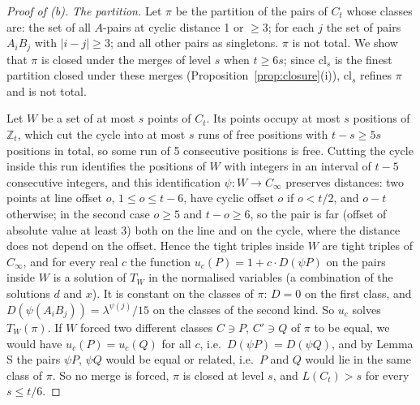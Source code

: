 \documentclass[11pt,a4paper]{article}
\theoremstyle{definition}
\theoremstyle{remark}
\newcommand{\cl}{\mathrm{cl}}
\newcommand{\Z}{\mathbb{Z}}
\newcommand{\step}[1]{\smallskip\noindent\emph{#1}}
\begin{document}
\begin{proof}[Proof of (b)]
\step{The partition.} Let $\pi$ be the partition of the pairs of $C_t$ whose classes are: the set of all $A$-pairs
at cyclic distance 1 or $\ge 3$; for each $j$ the set of pairs $A_iB_j$ with $|i - j| \ge 3$; and all other pairs as
singletons. $\pi$ is not total. We show that $\pi$ is closed under the merges of level $s$ when $t \ge 6s$; since
$\cl_s$ is the finest partition closed under these merges (Proposition~\ref{prop:closure}(i)), $\cl_s$ refines $\pi$
and is not total.

Let $W$ be a set of at most $s$ points of $C_t$. Its points occupy at most $s$ positions of $\Z_t$, which cut the
cycle into at most $s$ runs of free positions with $t - s \ge 5s$ positions in total, so some run of 5 consecutive
positions is free. Cutting the cycle inside this run identifies the positions of $W$ with integers in an interval
of $t - 5$ consecutive integers, and this identification $\psi\colon W \to C_\infty$ preserves distances: two points
at line offset $o$, $1 \le o \le t - 6$, have cyclic offset $o$ if $o < t/2$, and $o - t$ otherwise; in the second
case $o \ge 5$ and $t - o \ge 6$, so the pair is far (offset of absolute value at least 3) both on the line and on
the cycle, where the distance does not depend on the offset. Hence the tight triples inside $W$ are tight triples of
$C_\infty$, and for every real $c$ the function $u_c(P) = 1 + c\cdot D(\psi P)$ on the pairs inside $W$ is a
solution of $T_W$ in the normalised variables (a combination of the solutions $d$ and $x$). It is constant on the
classes of $\pi$: $D = 0$ on the first class, and $D(\psi(A_iB_j)) = \lambda^{\psi(j)}/15$ on the classes of the
second kind. So $u_c$ solves $T_W(\pi)$. If $W$ forced two different classes $C \ni P$, $C' \ni Q$ of $\pi$ to be
equal, we would have $u_c(P) = u_c(Q)$ for all $c$, i.e.\ $D(\psi P) = D(\psi Q)$, and by Lemma S the pairs
$\psi P$, $\psi Q$ would be equal or related, i.e.\ $P$ and $Q$ would lie in the same class of $\pi$. So no merge is
forced, $\pi$ is closed at level $s$, and $L(C_t) > s$ for every $s \le t/6$.
\end{proof}
\end{document}
